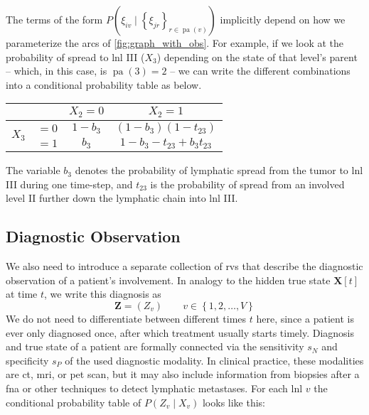 \documentclass[twocolumn]{article}
\begin{document}
The terms of the form $P \left( \xi_{iv} \mid \left\{ \xi_{jr} \right\}_{r \in \operatorname{pa}(v)} \right)$ implicitly depend on how we parameterize the arcs of \cref{fig:graph_with_obs}. For example, if we look at the probability of spread to \gls{lnl} III ($X_3$) depending on the state of that level's parent -- which, in this case, is $\operatorname{pa}(3) = 2$ -- we can write the different combinations into a conditional probability table as below.

\begin{table}[!h]
\centering
\begin{tabular}{|cc|cc|}
    \hline
    & & $X_2=0$ & $X_2=1$ \\
    \hline
    \multirow{2}{*}{$X_3$} & $=0$ & $1-b_3$ & $(1-b_3)(1-t_{23})$ \\
    & $=1$ & $b_3$ & $1-b_3-t_{23}+b_3 t_{23}$ \\
    \hline
\end{tabular}
\end{table}

The variable $b_3$ denotes the probability of lymphatic spread from the tumor to \gls{lnl} III during one time-step, and $t_{23}$ is the probability of spread from an involved level II further down the lymphatic chain into \gls{lnl} III. 

\subsection{Diagnostic Observation}
\label{subsec:formalism:diagnosis}

We also need to introduce a separate collection of \glspl{rv} that describe the diagnostic observation of a patient's involvement. In analogy to the hidden true state $\mathbf{X}[t]$ at time $t$, we write this diagnosis as
%
\begin{equation}
    \mathbf{Z} = \left( Z_v \right) \qquad v \in \left\{ 1,2, \ldots, V \right\}
\end{equation}
%
We do not need to differentiate between different times $t$ here, since a patient is ever only diagnosed once, after which treatment usually starts timely.
Diagnosis and true state of a patient are formally connected via the sensitivity $s_N$ and specificity $s_P$ of the used diagnostic modality. In clinical practice, these modalities are \gls{ct}, \gls{mri}, or \gls{pet} scan, but it may also include information from biopsies after a \gls{fna} or other techniques to detect lymphatic metastases. For each \gls{lnl} $v$ the conditional probability table of $P\left( Z_v \mid X_v \right)$ looks like this:
\end{document}
